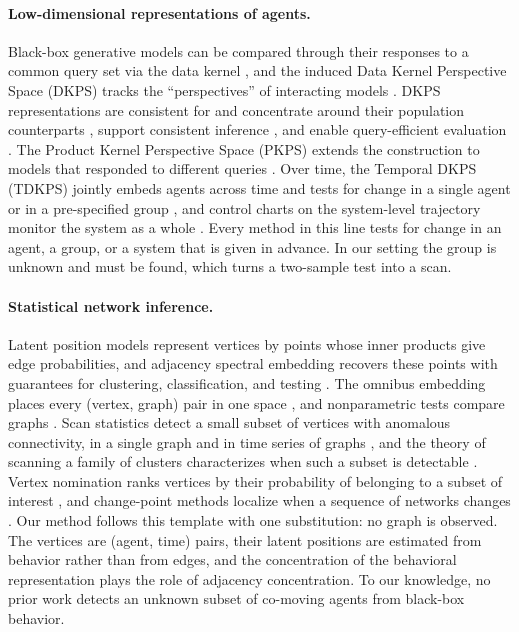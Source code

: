 \documentclass{article}
\theoremstyle{plain}
\theoremstyle{definition}
\begin{document}
\paragraph{Low-dimensional representations of agents.}
Black-box generative models can be compared through their responses to a common query set via the data kernel \citep{duderstadt2023comparing}, and the induced Data Kernel Perspective Space (DKPS) tracks the ``perspectives'' of interacting models \citep{helm2024tracking}. DKPS representations are consistent for and concentrate around their population counterparts \citep{acharyya2024consistent,acharyya2025concentration}, support consistent inference \citep{helm2025statistical}, and enable query-efficient evaluation \citep{helm2026query}. The Product Kernel Perspective Space (PKPS) extends the construction to models that responded to different queries \citep{pkps2026}. Over time, the Temporal DKPS (TDKPS) jointly embeds agents across time and tests for change in a single agent or in a pre-specified group \citep{bridgeford2025detecting}, and control charts on the system-level trajectory monitor the system as a whole \citep{helm2026control}. Every method in this line tests for change in an agent, a group, or a system that is given in advance. In our setting the group is unknown and must be found, which turns a two-sample test into a scan.

\paragraph{Statistical network inference.}
Latent position models represent vertices by points whose inner products give edge probabilities, and adjacency spectral embedding recovers these points with guarantees for clustering, classification, and testing \citep{athreya2018statistical,lyzinski2014perfect,lyzinski2017community,priebe2019two}. The omnibus embedding places every (vertex, graph) pair in one space \citep{levin2017omnibus}, and nonparametric tests compare graphs \citep{tang2017nonparametric}. Scan statistics detect a small subset of vertices with anomalous connectivity, in a single graph and in time series of graphs \citep{priebe2005scan,rukhin2011comparative,park2013anomaly,wang2014locality,chen2025multiple}, and the theory of scanning a family of clusters characterizes when such a subset is detectable \citep{glaz2001scan,kulldorff1997spatial,ariascastro2011detection,verzelen2015community,hajek2015computational,sharpnack2016detecting}. Vertex nomination ranks vertices by their probability of belonging to a subset of interest \citep{fishkind2015vertex,agterberg2020vertex}, and change-point methods localize when a sequence of networks changes \citep{padilla2022change,wang2021optimal}. Our method follows this template with one substitution: no graph is observed. The vertices are (agent, time) pairs, their latent positions are estimated from behavior rather than from edges, and the concentration of the behavioral representation plays the role of adjacency concentration. To our knowledge, no prior work detects an unknown subset of co-moving agents from black-box behavior.
\end{document}
